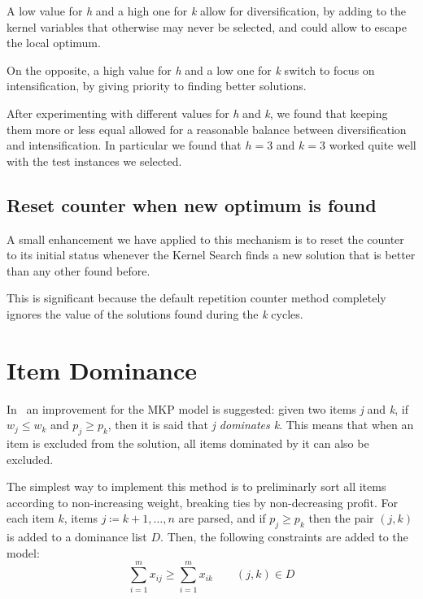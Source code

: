 A low value for \textit{h} and a high one for \textit{k} allow for
diversification, by adding to the kernel variables that otherwise
may never be selected, and could allow to escape the local optimum.

On the opposite, a high value for \textit{h} and a low one for \textit{k}
switch to focus on intensification, by giving priority to finding
better solutions.

After experimenting with different values for \textit{h} and \textit{k},
we found that keeping them more or less equal allowed for
a reasonable balance between diversification and intensification.
In particular we found that \(h=3\) and \(k=3\) worked quite well
with the test instances we selected.

\subsection{Reset counter when new optimum is found}
A small enhancement we have applied to this mechanism
is to reset the counter to its initial status
whenever the Kernel Search finds a new solution
that is better than any other found before.

This is significant because the default repetition counter
method completely ignores the value of the solutions found
during the \textit{k} cycles.


\section{Item Dominance}
In~\cite{mkp:2019} an improvement for the MKP model is suggested:
given two items \textit{j} and \textit{k}, if \(w_{j} \leq w_{k}\)
and \(p_{j} \geq p_{k}\), then it is said that \textit{j dominates k}.
This means that when an item is excluded from the solution,
all items dominated by it can also be excluded.

The simplest way to implement this method is to preliminarly sort all
items according to non-increasing weight, breaking ties by
non-decreasing profit.
For each item \(k\), items \(j \coloneqq k+1,\dots,n\) are parsed,
and if \(p_{j} \geq p_{k}\) then the pair \((j,k)\) is added to a
dominance list \(D\).
Then, the following constraints are added to the model:
\begin{equation}
    \label{eq:itemdom}
    \sum_{i=1}^{m} x_{ij} \geq \sum_{i=1}^{m} x_{ik} \qquad (j,k) \in D
\end{equation}

